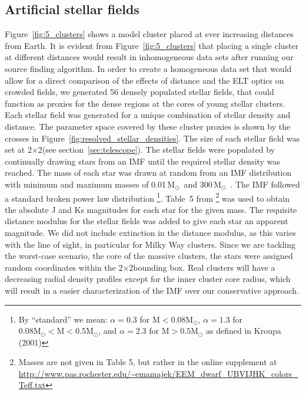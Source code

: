 \documentclass{aa}
\newcommand{\msun}{M$_\odot$~}
\begin{document}
\subsection{Artificial stellar fields}
  \label{subsec:stellar_fields}
Figure~\ref{fig:5_clusters} shows a model cluster placed at ever increasing distances from Earth.
It is evident from Figure~\ref{fig:5_clusters} that placing a single cluster at different distances would result in inhomogeneous data sets after running our source finding algorithm.
In order to create a homogeneous data set that would allow for a direct comparison of the effects of distance and the ELT optics on crowded fields, we generated 56 densely populated stellar fields, that could function as proxies for the dense regions at the cores of young stellar clusters.
Each stellar field was generated for a unique combination of stellar density and distance.
The parameter space covered by these cluster proxies is shown by the crosses in Figure~\ref{fig:resolved_stellar_densities}.
The size of each stellar field was set at 2\arcsec$\times$2\arcsec (see section~\ref{sec:telescope}).
The stellar fields were populated by continually drawing stars from an IMF until the required stellar density was reached.
The mass of each star was drawn at random from an IMF distribution with minimum and maximum masses of 0.01\,\msun and 300\,\msun.
The IMF followed a standard \citet{kroupa2001} broken power law distribution
\footnote{By ``standard'' we mean: $\alpha=0.3$ for $\mathrm{M} < 0.08 \mathrm{M}_\odot$, $\alpha=1.3$ for $0.08\mathrm{M}_\odot < \mathrm{M} < 0.5 \mathrm{M}_\odot$, and $\alpha=2.3$ for $\mathrm{M} > 0.5 \mathrm{M}_\odot$ as defined in Kroupa (2001)}.
Table~5 from \citet{pecaut2013}\footnote{Masses are not given in Table 5, but rather in the online supplement at \url{http://www.pas.rochester.edu/~emamajek/EEM_dwarf_UBVIJHK_colors_Teff.txt}}
was used to obtain the absolute J and Ks magnitudes for each star for the given mass.
The requisite distance modulus for the stellar fields was added to give each star an apparent magnitude.
We did not include extinction in the distance modulus, as this varies with the line of sight, in particular for Milky Way clusters.
Since we are tackling the worst-case scenario, the core of the massive clusters, the stars were assigned random coordinates within the 2\arcsec$\times$2\arcsec bounding box.
Real clusters will have a decreasing radial density profiles except for the inner cluster core radius, which will result in a easier characterization of the IMF over our conservative approach.
\end{document}
